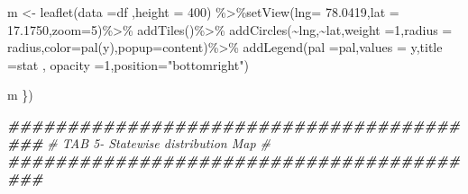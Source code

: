 \documentclass[
]{article}
\newenvironment{Shaded}{\begin{snugshade}}{\end{snugshade}}
\newcommand{\AttributeTok}[1]{\textcolor[rgb]{0.77,0.63,0.00}{#1}}
\newcommand{\CommentTok}[1]{\textcolor[rgb]{0.56,0.35,0.01}{\textit{#1}}}
\newcommand{\DecValTok}[1]{\textcolor[rgb]{0.00,0.00,0.81}{#1}}
\newcommand{\DocumentationTok}[1]{\textcolor[rgb]{0.56,0.35,0.01}{\textbf{\textit{#1}}}}
\newcommand{\FloatTok}[1]{\textcolor[rgb]{0.00,0.00,0.81}{#1}}
\newcommand{\FunctionTok}[1]{\textcolor[rgb]{0.00,0.00,0.00}{#1}}
\newcommand{\NormalTok}[1]{#1}
\newcommand{\OtherTok}[1]{\textcolor[rgb]{0.56,0.35,0.01}{#1}}
\newcommand{\SpecialCharTok}[1]{\textcolor[rgb]{0.00,0.00,0.00}{#1}}
\newcommand{\StringTok}[1]{\textcolor[rgb]{0.31,0.60,0.02}{#1}}
\begin{document}
\begin{Shaded}
\begin{Highlighting}[]
    
\NormalTok{    m }\OtherTok{\textless{}{-}} \FunctionTok{leaflet}\NormalTok{(}\AttributeTok{data =}\NormalTok{df ,}\AttributeTok{height =} \DecValTok{400}\NormalTok{) }\SpecialCharTok{\%\textgreater{}\%}\FunctionTok{setView}\NormalTok{(}\AttributeTok{lng=} \FloatTok{78.0419}\NormalTok{,}\AttributeTok{lat =} \FloatTok{17.1750}\NormalTok{,}\AttributeTok{zoom=}\DecValTok{5}\NormalTok{)}\SpecialCharTok{\%\textgreater{}\%}
      \FunctionTok{addTiles}\NormalTok{()}\SpecialCharTok{\%\textgreater{}\%}
      \FunctionTok{addCircles}\NormalTok{(}\SpecialCharTok{\textasciitilde{}}\NormalTok{lng,}\SpecialCharTok{\textasciitilde{}}\NormalTok{lat,}\AttributeTok{weight =}\DecValTok{1}\NormalTok{,}\AttributeTok{radius =}\NormalTok{ radius,}\AttributeTok{color=}\FunctionTok{pal}\NormalTok{(y),}\AttributeTok{popup=}\NormalTok{content)}\SpecialCharTok{\%\textgreater{}\%}
      \FunctionTok{addLegend}\NormalTok{(}\AttributeTok{pal =}\NormalTok{pal,}\AttributeTok{values =}\NormalTok{ y,}\AttributeTok{title =}\NormalTok{stat , }\AttributeTok{opacity =}\DecValTok{1}\NormalTok{,}\AttributeTok{position=}\StringTok{"bottomright"}\NormalTok{)}
    
    
\NormalTok{    m}
\NormalTok{  \})}
  
  
  \DocumentationTok{\#\#\#\#\#\#\#\#\#\#\#\#\#\#\#\#\#\#\#\#\#\#\#\#\#\#\#\#\#\#\#\#\#\#\#\#\#\#\#\#\#}
  \CommentTok{\#    TAB 5{-} Statewise distribution Map  \#}
  \DocumentationTok{\#\#\#\#\#\#\#\#\#\#\#\#\#\#\#\#\#\#\#\#\#\#\#\#\#\#\#\#\#\#\#\#\#\#\#\#\#\#\#\#\#}
  

\end{Highlighting}
\end{Shaded}
\end{document}
